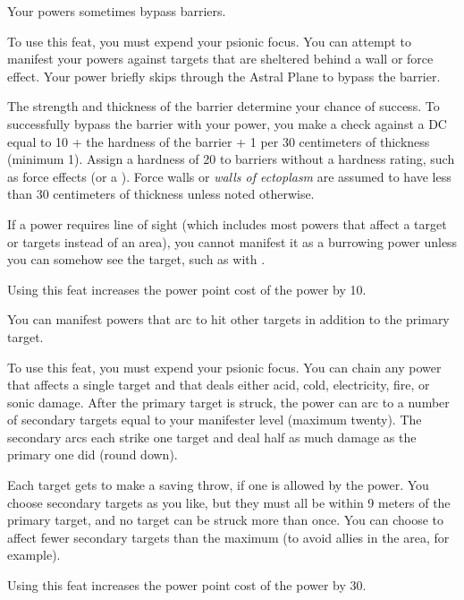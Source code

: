 
{Your powers sometimes bypass barriers.}{}
{To use this feat, you must expend your psionic focus. You can attempt to manifest your powers against targets that are sheltered behind a wall or force effect. Your power briefly skips through the Astral Plane to bypass the barrier.

The strength and thickness of the barrier determine your chance of success. To successfully bypass the barrier with your power, you make a  check against a DC equal to 10 + the hardness of the barrier + 1 per 30 centimeters of thickness (minimum 1). Assign a hardness of 20 to barriers without a hardness rating, such as force effects (or a ). Force walls or \emph{walls of ectoplasm} are assumed to have less than 30 centimeters of thickness unless noted otherwise.

If a power requires line of sight (which includes most powers that affect a target or targets instead of an area), you cannot manifest it as a burrowing power unless you can somehow see the target, such as with .

Using this feat increases the power point cost of the power by 10.}{}{}

{You can manifest powers that arc to hit other targets in addition to the primary target.}
{}
{To use this feat, you must expend your psionic focus. You can chain any power that affects a single target and that deals either acid, cold, electricity, fire, or sonic damage. After the primary target is struck, the power can arc to a number of secondary targets equal to your manifester level (maximum twenty). The secondary arcs each strike one target and deal half as much damage as the primary one did (round down).

Each target gets to make a saving throw, if one is allowed by the power. You choose secondary targets as you like, but they must all be within 9 meters of the primary target, and no target can be struck more than once. You can choose to affect fewer secondary targets than the maximum (to avoid allies in the area, for example).

Using this feat increases the power point cost of the power by 30.}{}{}

